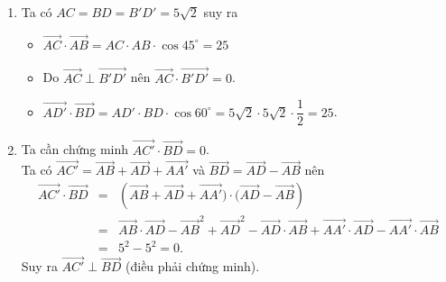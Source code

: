 \begin{bt}
{\begin{enumerate}
			Mà $\triangle C'BD$ đều nên $\widehat{C'BD} =  60^\circ$.
			\item Ta có $AC  = BD = B'D' = 5\sqrt{2}$ suy ra
			\begin{itemize}
				\item $\overrightarrow{AC}\cdot\overrightarrow{AB}  = AC\cdot AB\cdot \cos 45^\circ = 25$
				\item Do $\overrightarrow{AC}\perp\overrightarrow{B'D'}$  nên $\overrightarrow{AC}\cdot \overrightarrow{B'D'} = 0$.
				\item $\overrightarrow{AD'}\cdot \overrightarrow{BD} = AD'\cdot  BD\cdot \cos 60^\circ = 5\sqrt{2}\cdot 5\sqrt{2}\cdot \dfrac{1}{2} = 25$.
			\end{itemize}
			\item Ta cần  chứng minh $\overrightarrow{AC'}\cdot \overrightarrow{BD} = 0$.\\
			Ta có $\overrightarrow{AC'}  = \overrightarrow{AB} + \overrightarrow{AD} + \overrightarrow{AA'}$ và $\overrightarrow{BD} = \overrightarrow{AD} - \overrightarrow{AB}$ nên
			\begin{eqnarray*}
				\overrightarrow{AC'}\cdot \overrightarrow{BD} &=& \left(\overrightarrow{AB} + \overrightarrow{AD}  + \overrightarrow{AA'})\cdot(\overrightarrow{AD} - \overrightarrow{AB}\right)\\
				 &=& \overrightarrow{AB}\cdot\overrightarrow{AD} - \overrightarrow{AB}^2 + \overrightarrow{AD}^2 - \overrightarrow{AD}\cdot \overrightarrow{AB} + \overrightarrow{AA'}\cdot \overrightarrow{AD} - \overrightarrow{AA'}\cdot \overrightarrow{AB}\\ &=& 5^2 - 5^2 = 0.
			\end{eqnarray*}
			Suy ra $\overrightarrow{AC'}\perp \overrightarrow{BD}$ (điều phải chứng  minh).
		\end{enumerate}
	 }
\end{bt}

